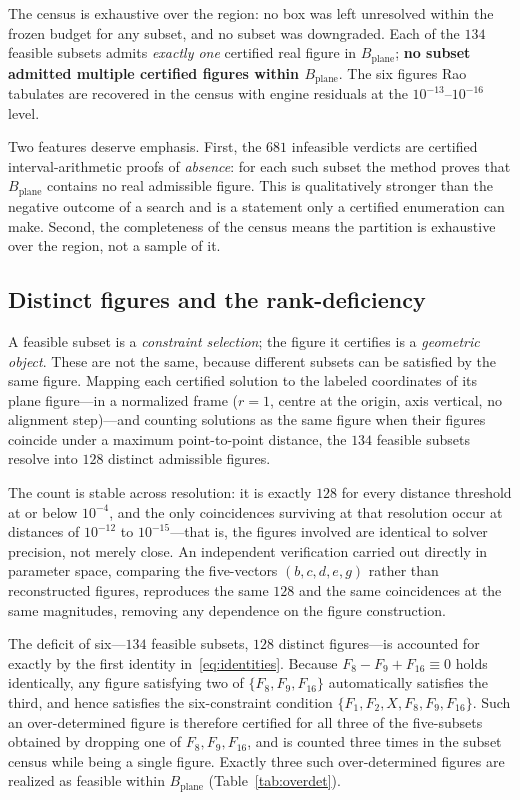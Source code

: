 \documentclass[pdflatex,sn-mathphys-num]{sn-jnl}
\newcommand{\Bplane}{B_{\mathrm{plane}}}
\begin{document}
The census is exhaustive over the region: no box was left unresolved within the frozen budget for any subset, and no subset was downgraded. Each of the $134$ feasible subsets admits \emph{exactly one} certified real figure in $\Bplane$; \textbf{no subset admitted multiple certified figures within $\Bplane$}. The six figures Rao tabulates are recovered in the census with engine residuals at the $10^{-13}$--$10^{-16}$ level.

Two features deserve emphasis. First, the $681$ infeasible verdicts are certified interval-arithmetic proofs of \emph{absence}: for each such subset the method proves that $\Bplane$ contains no real admissible figure. This is qualitatively stronger than the negative outcome of a search and is a statement only a certified enumeration can make. Second, the completeness of the census means the partition is exhaustive over the region, not a sample of it.

\subsection{Distinct figures and the rank-deficiency}\label{subsec:rank-deficiency}

A feasible subset is a \emph{constraint selection}; the figure it certifies is a \emph{geometric object}. These are not the same, because different subsets can be satisfied by the same figure. Mapping each certified solution to the labeled coordinates of its plane figure---in a normalized frame ($r=1$, centre at the origin, axis vertical, no alignment step)---and counting solutions as the same figure when their figures coincide under a maximum point-to-point distance, the $134$ feasible subsets resolve into $128$ distinct admissible figures.

The count is stable across resolution: it is exactly $128$ for every distance threshold at or below $10^{-4}$, and the only coincidences surviving at that resolution occur at distances of $10^{-12}$ to $10^{-15}$---that is, the figures involved are identical to solver precision, not merely close. An independent verification carried out directly in parameter space, comparing the five-vectors $(b,c,d,e,g)$ rather than reconstructed figures, reproduces the same $128$ and the same coincidences at the same magnitudes, removing any dependence on the figure construction.

The deficit of six---$134$ feasible subsets, $128$ distinct figures---is accounted for exactly by the first identity in~\eqref{eq:identities}. Because $F_8-F_9+F_{16}\equiv0$ holds identically, any figure satisfying two of $\{F_8,F_9,F_{16}\}$ automatically satisfies the third, and hence satisfies the six-constraint condition $\{F_1,F_2,X,F_8,F_9,F_{16}\}$. Such an over-determined figure is therefore certified for all three of the five-subsets obtained by dropping one of $F_8,F_9,F_{16}$, and is counted three times in the subset census while being a single figure. Exactly three such over-determined figures are realized as feasible within $\Bplane$ (Table~\ref{tab:overdet}).
\end{document}
